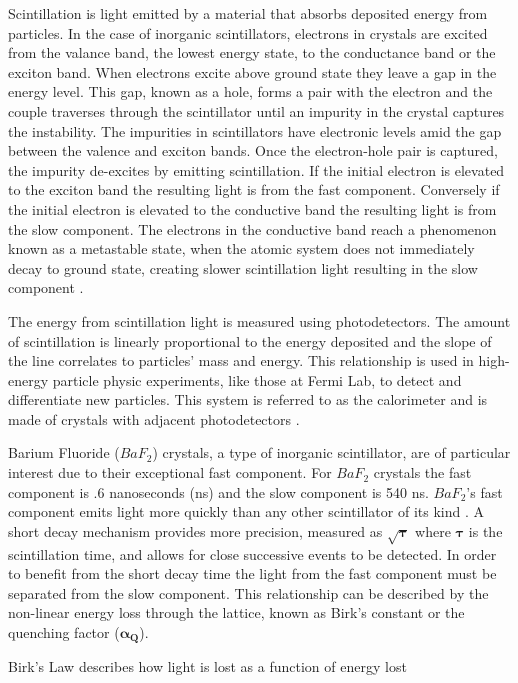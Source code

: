 \documentclass[aip, jmp, amsmath, amssymb, reprint, floatfix]{revtex4-1}
\begin{document}
Scintillation is light emitted by a material that absorbs deposited energy from particles. In the case of inorganic scintillators, electrons in crystals are excited from the valance band, the lowest energy state, to the conductance band or the exciton band. When electrons excite above ground state they leave a gap in the energy level. This gap, known as a hole, forms a pair with the electron and the couple traverses through the scintillator until an impurity in the crystal captures the instability. The impurities in scintillators have electronic levels amid the gap between the valence and exciton bands. Once the electron-hole pair is captured, the impurity de-excites by emitting scintillation. If the initial electron is elevated to the exciton band the resulting light is from the fast component. Conversely if the initial electron is elevated to the conductive band the resulting light is from the slow component. The electrons in the conductive band reach a phenomenon known as a metastable state, when the atomic system does not immediately decay to ground state, creating slower scintillation light resulting in the slow component \cite{scint}. 

The energy from scintillation light is measured using photodetectors. The amount of scintillation is linearly proportional to the energy deposited and the slope of the line correlates to particles' mass and energy. This relationship is used in high-energy particle physic experiments, like those at Fermi Lab, to detect and differentiate new particles. This system is referred to as the calorimeter and is made of crystals with adjacent photodetectors \cite{Mu2e}. 

Barium Fluoride ($BaF_2$) crystals, a type of inorganic scintillator, are of particular interest due to their exceptional fast component. For $BaF_2$ crystals the fast component is .6 nanoseconds (ns) and the slow component is 540 ns. $BaF_2$'s fast component emits light more quickly than any other scintillator of its kind \cite{BaF2specs}. A short decay mechanism provides more precision, measured as $\bm{\sqrt{\tau}}$ where $\bm{\tau}$ is the scintillation time, and allows for close successive events to be detected. In order to benefit from the short decay time the light from the fast component must be separated from the slow component. This relationship can be described by the non-linear energy loss through the lattice, known as Birk's constant or the quenching factor ($\bm{\alpha_Q}$). 

Birk's Law describes how light is lost as a function of energy lost  
\end{document}
